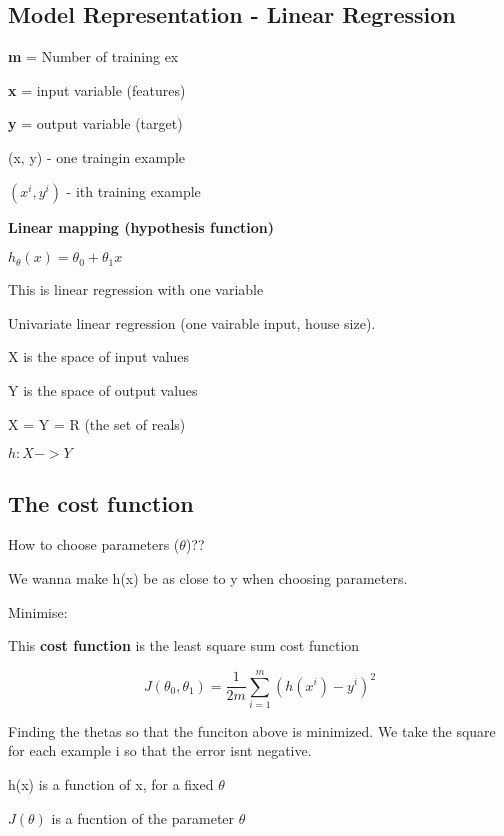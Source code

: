 \documentclass{article}
\begin{document}
\subsection{Model Representation - Linear Regression}


\textbf{m} = Number of training ex

\textbf{x} = input variable (features)

\textbf{y} = output variable (target)

(x, y) - one traingin example


$(x^{i}, y^{i})$ - ith training example 


\textbf{Linear mapping (hypothesis function)}

$h_{\theta} (x)  = \theta_0 + \theta_{1} x$

This is linear regression with one variable 

Univariate linear regression (one vairable input, house size). 

X is the space of input values 

Y is the space of output values 

X = Y = R (the set of reals)

$h: X -> Y$


\subsection{The cost function}

How to choose parameters ($\theta$)??

We wanna make h(x) be as close to y when choosing parameters. 



Minimise:

This \textbf{cost function} is the least square sum cost function

\begin{equation}
    J(\theta_0, \theta_1) = \frac{1}{2m} \sum_{i = 1}^{m} \left(h(x^{i}) - y^{i}  \right)^2
\end{equation}

Finding the thetas so that the funciton above is minimized. We take the square for each example i so that the error isnt negative. 


h(x) is a function of x, for a fixed $\theta$

$J(\theta)$ is a fucntion of the parameter $\theta$



\hspace{}
\end{document}
